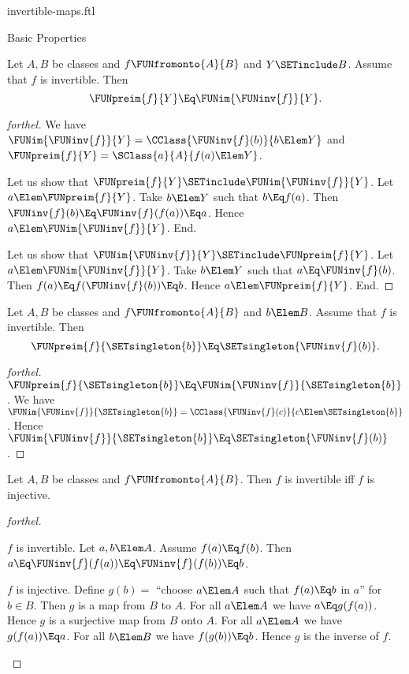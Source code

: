 \documentclass{stex}
\begin{document}
\begin{smodule}{invertible-maps.ftl}
\begin{sfragment}{Basic Properties}
  \begin{proposition}[forthel]
    Let $A, B$ be classes and $f \FUNfromonto{A}{B}$ and $Y \SETinclude B$.
    Assume that $f$ is invertible.
    Then \[ \FUNpreim{f}{Y} \Eq \FUNim{\FUNinv{f}}{Y}. \]
  \end{proposition}
  \begin{proof}[forthel]
    We have $\FUNim{\FUNinv{f}}{Y} = \CClass{\FUNinv{f}(b)}{b \Elem Y}$ and $\FUNpreim{f}{Y} = \SClass{a}{A}{f(a) \Elem Y}$.

    Let us show that $\FUNpreim{f}{Y} \SETinclude \FUNim{\FUNinv{f}}{Y}$.
      Let $a \Elem \FUNpreim{f}{Y}$.
      Take $b \Elem Y$ such that $b \Eq f(a)$.
      Then $\FUNinv{f}(b) \Eq \FUNinv{f}(f(a)) \Eq a$.
      Hence $a \Elem \FUNim{\FUNinv{f}}{Y}$.
    End.

    Let us show that $\FUNim{\FUNinv{f}}{Y} \SETinclude \FUNpreim{f}{Y}$.
      Let $a \Elem \FUNim{\FUNinv{f}}{Y}$.
      Take $b \Elem Y$ such that $a \Eq \FUNinv{f}(b)$.
      Then $f(a) \Eq f(\FUNinv{f}(b)) \Eq b$.
      Hence $a \Elem \FUNpreim{f}{Y}$.
    End.
  \end{proof}

  \begin{corollary}[forthel]
    Let $A, B$ be classes and $f \FUNfromonto{A}{B}$ and $b \Elem B$.
    Assume that $f$ is invertible.
    Then \[ \FUNpreim{f}{\SETsingleton{b}} \Eq \SETsingleton{\FUNinv{f}(b)}. \]
  \end{corollary}
  \begin{proof}[forthel]
    $\FUNpreim{f}{\SETsingleton{b}} \Eq \FUNim{\FUNinv{f}}{\SETsingleton{b}}$.
    We have $\FUNim{\FUNinv{f}}{\SETsingleton{b}} = \CClass{\FUNinv{f}(c)}{c \Elem \SETsingleton{b}}$.
    Hence $\FUNim{\FUNinv{f}}{\SETsingleton{b}} \Eq \SETsingleton{\FUNinv{f}(b)}$.
  \end{proof}

  \begin{proposition}[forthel]
    Let $A, B$ be classes and $f \FUNfromonto{A}{B}$.
    Then $f$ is invertible iff $f$ is injective.
  \end{proposition}
  \begin{proof}[forthel]
    \begin{case}{$f$ is invertible.}
      Let $a, b \Elem A$.
      Assume $f(a) \Eq f(b)$.
      Then $a \Eq \FUNinv{f}(f(a)) \Eq \FUNinv{f}(f(b)) \Eq b$.
    \end{case}

    \begin{case}{$f$ is injective.}
      Define $g(b) =$ ``choose $a \Elem A$ such that $f(a) \Eq b$ in $a$'' for
      $b \in B$.
      Then $g$ is a map from $B$ to $A$.
      For all $a \Elem A$ we have $a \Eq g(f(a))$.
      Hence $g$ is a surjective map from $B$ onto $A$.
      For all $a \Elem A$ we have $g(f(a)) \Eq a$.
      For all $b \Elem B$ we have $f(g(b)) \Eq b$.
      Hence $g$ is the inverse of $f$.
    \end{case}
  \end{proof}


\end{sfragment}
\end{smodule}
\end{document}
